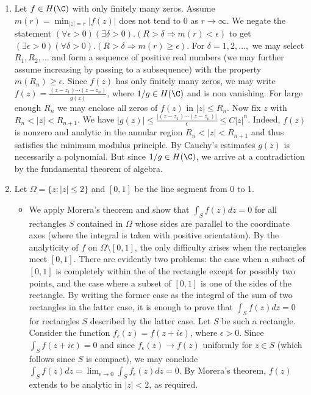 \documentclass[11pt]{book}
\theoremstyle{definition}
\begin{document}
\begin{enumerate}
\begin{proof}
\end{proof}
\item
Let $f\in H(\C)$ with only finitely many zeros. Assume $m(r)=\min_{|z|=r}|f(z)|$ does not tend to 0 as $r\to \infty$. We negate the statement $(\forall\epsilon>0)(\exists\delta>0).(R>\delta\Rightarrow m(r)<\epsilon)$ to get $(\exists\epsilon>0)(\forall\delta>0).(R>\delta\Rightarrow m(r)\geq \epsilon)$. For $\delta=1,2,\dotsc,$ we may select $R_1,R_2,\dotsc$ and form a sequence of positive real numbers (we may further assume increasing by passing to a subsequence) with the property $m(R_n)\geq \epsilon$. Since $f(z)$ has only finitely many zeros, we may write $f(z)=\frac{(z-z_1)\cdots(z-z_n)}{g(z)}$, where $1/g\in H(\C)$ and is non vanishing. For large enough $R_n$ we may enclose all zeros of $f(z)$ in $|z|\leq R_n$. Now fix $z$ with $R_n<|z|<R_{n+1}$. We have $|g(z)|\leq \frac{|(z-z_1)\cdots(z-z_n)|}{\epsilon}\leq C|z|^n$. Indeed, $f(z)$ is nonzero and analytic in the annular region $R_n<|z|<R_{n+1}$ and thus satisfies the minimum modulus principle. By Cauchy's estimates $g(z)$ is necessarily a polynomial. But since $1/g\in H(\C)$, we arrive at a contradiction by the fundamental theorem of algebra.
\item Let $\Omega=\{z:|z|\leq 2\}$ and $[0,1]$ be the line segment from 0 to 1.
\begin{itemize} 
\item We apply Morera's theorem and show that $\int_S f(z)dz=0$ for all rectangles $S$ contained in $\Omega$ whose sides are parallel to the coordinate axes (where the integral is taken with positive orientation). By the analyticity of $f$ on $\Omega\setminus[0,1]$, the only difficulty arises when the rectangles meet $[0,1]$. There are evidently two problems: the case when a subset of $[0,1]$ is completely within the of the rectangle except for possibly two points, and the case where a subset of $[0,1]$ is one of the sides of the rectangle. By writing the former case as the integral of the sum of two rectangles in the latter case, it is enough to prove that $\int_S f(z)dz=0$ for rectangles $S$ described by the latter case. Let $S$ be such a rectangle. Consider the function $f_{\epsilon}(z)=f(z+i\epsilon)$, where $\epsilon>0$. Since $\int_S f(z+i\epsilon)=0$ and since $f_{\epsilon}(z)\to f(z)$ uniformly for $z\in S$ (which follows since $S$ is compact), we may conclude $\int_S f(z)dz = \lim_{\epsilon\to 0}\int_S f_{\epsilon}(z)dz = 0$. By Morera's theorem, $f(z)$ extends to be analytic in $|z|<2$, as required.

\end{itemize}
\end{enumerate}
\end{document}
